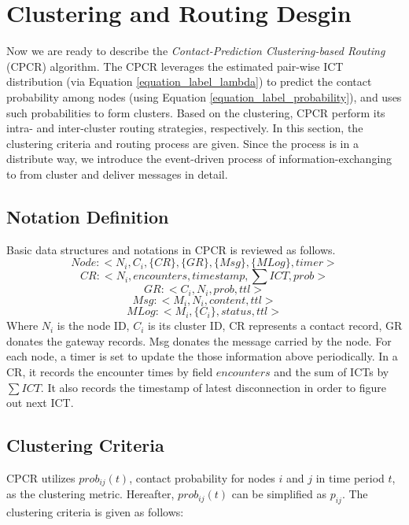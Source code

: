 \section{Clustering and Routing Desgin}
\label{Section4_algorithm}

Now we are ready to describe the \emph{Contact-Prediction Clustering-based Routing} (CPCR) algorithm.
The CPCR leverages the estimated pair-wise ICT distribution (via Equation \ref{equation_label_lambda}) to predict the contact probability among nodes (using Equation \ref{equation_label_probability}), and uses such probabilities to form clusters. Based on the clustering, CPCR perform its intra- and inter-cluster routing strategies, respectively. In this section, the clustering criteria and routing process are given. Since the process is in a distribute way, we introduce the event-driven process of information-exchanging to from cluster and deliver messages in detail.
\subsection{Notation Definition}
Basic data structures and notations in CPCR is reviewed as follows.
\begin{equation}
 Node :<N_i, C_i, \{CR\}, \{GR\}, \{Msg\},\{MLog\},timer>
\end{equation}
\begin{equation}\label{xxx}
  CR :<N_i,encounters,timestamp,\sum ICT,prob>
\end{equation}
\begin{equation}\label{xxx2}
GR :<C_i,N_i,prob,ttl>
\end{equation}
\begin{equation}\label{xxx3}
Msg:<M_i,N_i,content,ttl>
\end{equation}
\begin{equation}\label{xxx4}
MLog:<M_i,\{C_i\},status,ttl>
\end{equation}
Where $N_i$ is the node ID, $C_i$ is its cluster ID, CR represents a contact record, GR donates the gateway records. Msg donates the message carried by the node. For each node, a timer is set to update the those information above periodically. In a CR, it records the encounter times by field $encounters$ and the sum of ICTs by $\sum ICT$. It also records the timestamp of latest disconnection in order to figure out next ICT.

\subsection{Clustering Criteria}
CPCR utilizes $prob_{ij}(t)$, contact probability for nodes $i$ and $j$ in time period $t$, as the clustering metric. Hereafter, $prob_{ij}(t)$ can be simplified as $p_{ij}$. The clustering criteria is given as follows:

